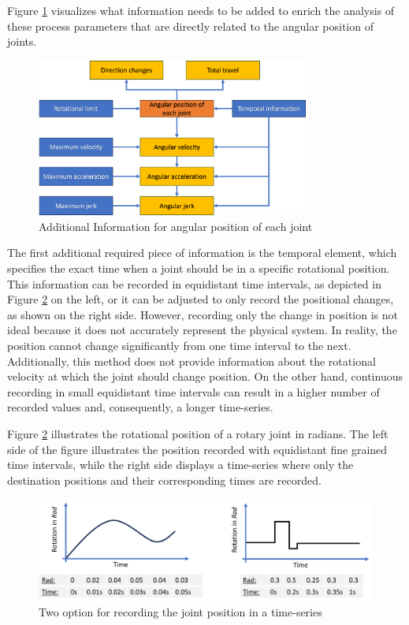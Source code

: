 Figure \ref{agularstuff} visualizes what information needs to be added to enrich the analysis of these process parameters that are directly related to the angular position of joints.

\begin{figure}[H]
	\centerline{\includegraphics[width=0.8\textwidth]{figures/angularstuff.png}}
	\caption{Additional Information for angular position of each joint}
	\label{agularstuff}
\end{figure}



The first additional required piece of information is the temporal element, which specifies the exact time when a joint should be in a specific rotational position. This information can be recorded in equidistant time intervals, as depicted in Figure \ref{equi} on the left, or it can be adjusted to only record the positional changes, as shown on the right side. However, recording only the change in position is not ideal because it does not accurately represent the physical system. In reality, the position cannot change significantly from one time interval to the next. Additionally, this method does not provide information about the rotational velocity at which the joint should change position. On the other hand, continuous recording in small equidistant time intervals can result in a higher number of recorded values and, consequently, a longer time-series.

Figure \ref{equi} illustrates the rotational position of a rotary joint in radians. The left side of the figure illustrates the position recorded with equidistant fine grained time intervals, while the right side displays a time-series where only the destination positions and their corresponding times are recorded.


\begin{figure}[H]
	\centerline{\includegraphics[width=1\textwidth]{figures/equionchange.png}}
	\caption{Two option for recording the joint position in a time-series}
	\label{equi}
\end{figure}

